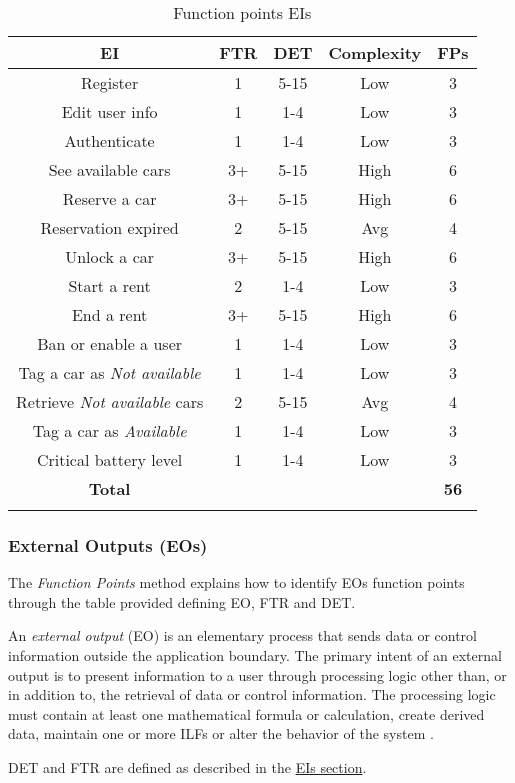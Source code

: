\begin{longtable}{ccccc}
\toprule
\textbf{EI}	& FTR & DET & 	Complexity  & \textbf{FPs}\\
\midrule
Register & 1 & 5-15 &	Low & 3 \\
Edit user info & 1 & 1-4 &	Low & 3 \\
Authenticate &1 & 1-4 & Low & 3 \\
See available cars & 3+ & 5-15 & High & 6 \\
Reserve a car & 3+ & 5-15 & High & 6 \\
Reservation expired & 2 & 5-15 & Avg & 4 \\
Unlock a car & 3+ & 5-15 & High & 6 \\
Start a rent & 2 & 1-4 &	Low & 3 \\
End a rent & 3+ & 5-15 & High & 6 \\
Ban or enable a user & 1 & 1-4 &	Low & 3 \\
Tag a car as \emph{Not available} & 1 & 1-4 &	Low & 3 \\
Retrieve \emph{Not available} cars & 2 & 5-15 & Avg & 4\\
Tag a car as \emph{Available} & 1 & 1-4 &	Low & 3\\
Critical battery level & 1 & 1-4 &	Low & 3\\
\midrule
\textbf{Total} & & & &  \textbf{56}\\
\bottomrule 
\caption{Function points EIs}
\label{tbl:eiFP}
\end{longtable}


\subsubsection{External Outputs (EOs)} 

The \emph{Function Points} method explains how to identify EOs function points through the table provided defining EO, FTR and DET.

An \textit{external output} (EO) is an elementary process that sends data or control information outside the application boundary. The primary intent of an external output is to present information to a user through processing logic other than, or in addition to, the retrieval of data or control information. The processing logic must contain at least one mathematical formula or calculation, create derived data, maintain one or more ILFs or alter the behavior of the system \cite{FP}.

DET and FTR are defined as described in the \hyperref[sec:EIs]{EIs section}.\\

